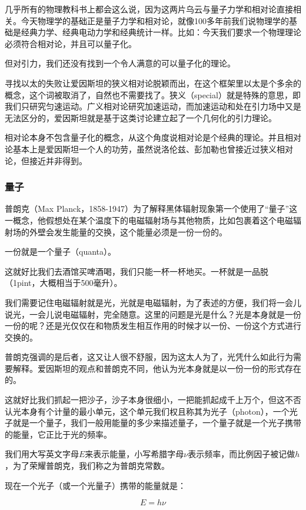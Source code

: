 几乎所有的物理教科书上都会这么说，因为这两片乌云与量子力学和相对论直接相关。今天物理学的基础正是量子力学和相对论，就像100多年前我们说物理学的基础是经典力学、经典电动力学和经典统计一样。比如：今天我们要求一个物理理论必须符合相对论，并且可以量子化。

但对引力，我们还没有找到一个令人满意的可以量子化的理论。

寻找以太的失败让爱因斯坦的狭义相对论脱颖而出，在这个框架里以太是个多余的概念，这个词被取消了，自然也不需要找了。狭义（special）就是特殊的意思，即我们只研究匀速运动。广义相对论研究加速运动，而加速运动和处在引力场中又是无法区分的，爱因斯坦就是基于这类讨论建立起了一个几何化的引力理论。

相对论本身不包含量子化的概念，从这个角度说相对论是个经典的理论。并且相对论基本上是爱因斯坦一个人的功劳，虽然说洛伦兹、彭加勒也曾接近过狭义相对论，但接近并非得到。

\subsubsection{量子}

普朗克（Max Planck，1858-1947）为了解释黑体辐射现象第一个使用了“量子”这一概念，他假想处在某个温度下的电磁辐射场与其他物质，比如包裹着这个电磁辐射场的外壁会发生能量的交换，这个能量必须是一份一份的。

一份就是一个量子（quanta）。

这就好比我们去酒馆买啤酒喝，我们只能一杯一杯地买。一杯就是一品脱（1pint，大概相当于500毫升）。

我们需要记住电磁辐射就是光，光就是电磁辐射，为了表述的方便，我们将一会儿说光，一会儿说电磁辐射，完全随意。这里的问题是光是什么？光是本身就是一份一份的呢？还是光仅仅在和物质发生相互作用的时候才以一份、一份这个方式进行交换的。

普朗克强调的是后者，这又让人很不舒服，因为这太人为了，光凭什么如此行为需要解释。爱因斯坦的观点和普朗克不同，他认为光本身就是以一份一份的形式存在的。

这就好比我们抓起一把沙子，沙子本身很细小，一把能抓起成千上万个，但这不否认光本身有个计量的最小单元，这个单元我们权且称其为光子（photon），一个光子就是一个量子，我们一般用能量的多少来描述量子，一个量子就是一个光子携带的能量，它正比于光的频率。

我们用大写英文字母$E$来表示能量，小写希腊字母$\nu$表示频率，而比例因子被记做$h$，为了荣耀普朗克，我们称之为普朗克常数。

现在一个光子（或一个光量子）携带的能量就是：

\begin{equation}
E=h \nu
\end{equation}

